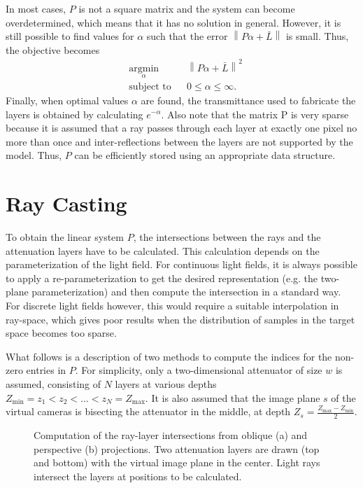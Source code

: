 In most cases, $P$ is not a square matrix and the system can become overdetermined, which means that it has no solution in general.
However, it is still possible to find values for $\alpha$ such that the error $\left\lVert P \alpha + \bar{L} \right\rVert$ is small. 
Thus, the objective becomes
\begin{equation} \label{eq:minimize_norm}
	\begin{aligned}
		& \underset{\alpha}{\text{argmin}} 	& & \left\lVert P \alpha + \bar{L} \right\rVert ^2 \\
		& \text{subject to} 				& & 0 \leq \alpha \leq \infty.
	\end{aligned}
\end{equation}
Finally, when optimal values $\alpha$ are found, the transmittance used to fabricate the layers is obtained by calculating $e^{-\alpha}$.
Also note that the matrix P is very sparse because it is assumed that a ray passes through each layer at exactly one pixel no more than once and inter-reflections between the layers are not supported by the model.
Thus, $P$ can be efficiently stored using an appropriate data structure.

\section{Ray Casting}
\label{sec:ray_casting}

To obtain the linear system $P$, the intersections between the rays and the attenuation layers have to be calculated.
This calculation depends on the parameterization of the light field.
For continuous light fields, it is always possible to apply a re-parameterization to get the desired representation (e.g. the two-plane parameterization) and then compute the intersection in a standard way.
For discrete light fields however, this would require a suitable interpolation in ray-space, which gives poor results when the distribution of samples in the target space becomes too sparse.

What follows is a description of two methods to compute the indices for the non-zero entries in $P$. 
For simplicity, only a two-dimensional attenuator of size $w$ is assumed, consisting of $N$ layers at various depths 
$Z_{\text{min}} = z_1 < z_2 < \dots < z_N = Z_{\text{max}}$.
It is also assumed that the image plane $s$ of the virtual cameras is bisecting the attenuator in the middle, at depth 
$Z_s = \frac{Z_{\text{max}} - Z_{\text{min}}}{2}$.

\begin{figure}[htb]
	\centering
	\subfigure[]{
		\centering
		
		\label{fig:ray_casting_oblique_projection}
	}
	\hfill
	\subfigure[]{
		\centering
		
		\label{fig:ray_casting_perspective_projection}
	}
	\caption[Computation of the ray-layer intersections from oblique and perspective projections]
			{Computation of the ray-layer intersections from oblique (a) and perspective (b) projections.
			 Two attenuation layers are drawn (top and bottom) with the virtual image plane in the center.
			 Light rays intersect the layers at positions to be calculated.}
\end{figure}

